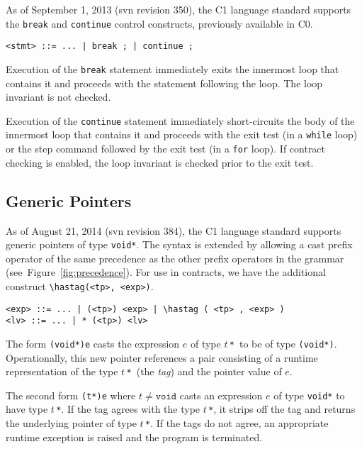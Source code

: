 \documentclass[11pt]{article}
\newcommand{\tstar}{\texttt{*}}
\newcommand{\tvoid}{\texttt{void}}
\begin{document}
As of September 1, 2013 (svn revision 350), the C1 language standard
supports the \lstinline'break' and \lstinline'continue' control constructs,
previously available in C0.
\begin{lstlisting}[basicstyle=\smallbasicstyle]
<stmt> ::= ... | break ; | continue ;
\end{lstlisting}

Execution of the \lstinline'break' statement immediately exits the
innermost loop that contains it and proceeds with the statement
following the loop. The loop invariant is not checked.

Execution of the \lstinline'continue' statement immediately short-circuits
the body of the innermost loop that contains it and proceeds with the
exit test (in a \lstinline'while' loop) or the step command followed by the
exit test (in a \lstinline'for' loop). If contract checking is enabled,
the loop invariant is checked prior to the exit test.

\subsection{Generic Pointers}

As of August 21, 2014 (svn revision 384), the C1 language standard
supports generic pointers of type \lstinline'void*'.  The syntax is
extended by allowing a cast prefix operator of the same precedence as
the other prefix operators in the grammar
(see~Figure~\ref{fig:precedence}).  For use in contracts, we have the
additional construct \lstinline'\hastag(<tp>, <exp>)'.
\begin{lstlisting}[basicstyle=\smallbasicstyle]
<exp> ::= ... | (<tp>) <exp> | \hastag ( <tp> , <exp> )
<lv> ::= ... | * (<tp>) <lv> 
\end{lstlisting}
The form \lstinline'(void*)e' casts the expression $e$ of type $t$\,\tstar\
to be of type \lstinline'(void*)'.  Operationally, this new pointer
references a pair consisting of a runtime representation of the type
$t$\,\tstar\ (the \emph{tag}) and the pointer value of $e$.

The second form \lstinline'(t*)e' where $t \not= \tvoid$ casts an
expression $e$ of type \lstinline'void*' to have type $t$\,\tstar.  If the
tag agrees with the type $t$\,\tstar, it strips off the tag and
returns the underlying pointer of type $t$\,\tstar.  If the tags do
not agree, an appropriate runtime exception is raised and the program
is terminated.
\end{document}
